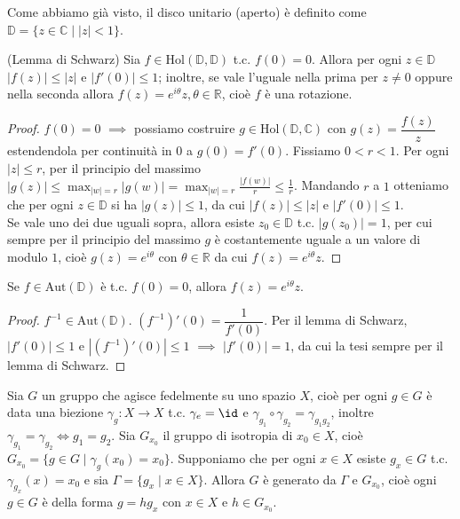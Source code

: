 Come abbiamo già visto, il disco unitario (aperto) è definito come $\mathbb{D}=\{z \in \mathbb{C} \mid |z|<1\}$.

\begin{lm}
  (Lemma di Schwarz) Sia $f \in \text{Hol}(\mathbb{D}, \mathbb{D})$ t.c. $f(0)=0$. Allora per ogni $z \in \mathbb{D}$ $|f(z)| \le |z|$ e $|f'(0)| \le 1$; inoltre, se vale l'uguale nella prima per $z \not=0$ oppure nella seconda allora $f(z)=e^{i\theta}z, \theta \in \mathbb{R}$, cioè $f$ è una rotazione.
\end{lm}

\begin{proof}
  $f(0)=0$ $\implies$ possiamo costruire $g \in \text{Hol}(\mathbb{D}, \mathbb{C})$ con $g(z)=\dfrac{f(z)}{z}$ estendendola per continuità in $0$ a $g(0)=f'(0)$. Fissiamo $0<r<1$.
  Per ogni $|z| \le r$, per il principio del massimo $\displaystyle |g(z)| \le \max_{|w|=r} |g(w)|=\max_{|w|=r} \frac{|f(w)|}{r} \le \frac{1}{r}$. Mandando $r$ a $1$ otteniamo che per ogni $z \in \mathbb{D}$ si ha $|g(z)| \le 1$, da cui $|f(z)|\le |z|$ e $|f'(0)| \le 1$. \\
  Se vale uno dei due uguali sopra, allora esiste $z_0 \in \mathbb{D}$ t.c. $|g(z_0)|=1$, per cui sempre per il principio del massimo $g$ è costantemente uguale a un valore di modulo $1$, cioè $g(z)=e^{i\theta}$ con $\theta \in \mathbb{R}$ da cui $f(z)=e^{i\theta}z$.
\end{proof}

\begin{cor}
  Se $f \in \text{Aut}(\mathbb{D})$ è t.c. $f(0)=0$, allora $f(z)=e^{i\theta}z$.
\end{cor}

\begin{proof}
  $f^{-1} \in \text{Aut}(\mathbb{D})$. $(f^{-1})'(0)=\dfrac{1}{f'(0)}$. Per il lemma di Schwarz, $|f'(0)| \le 1$ e $|(f^{-1})'(0)| \le 1$ $\implies$ $|f'(0)|=1$, da cui la tesi sempre per il lemma di Schwarz.
\end{proof}

\begin{lm} \label{az_gr}
  Sia $G$ un gruppo che agisce fedelmente su uno spazio $X$, cioè per ogni $g \in G$ è data una biezione $\gamma_g:X \longrightarrow X$ t.c. $\gamma_{e}=\id$ e $\gamma_{g_1} \circ \gamma_{g_2} =\gamma_{g_1g_2}$, inoltre $\gamma_{g_1}=\gamma_{g_2} \iff g_1=g_2$.
  Sia $G_{x_0}$ il gruppo di isotropia di $x_0 \in X$, cioè $G_{x_0}=\{g \in G \mid \gamma_g(x_0)=x_0\}$. Supponiamo che per ogni $x \in X$ esiste $g_x \in G$ t.c. $\gamma_{g_x}(x)=x_0$ e sia $\Gamma=\{g_x \mid x \in X\}$.
  Allora $G$ è generato da $\Gamma$ e $G_{x_0}$, cioè ogni $g \in G$ è della forma $g=hg_x$ con $x \in X$ e $h \in G_{x_0}$.
\end{lm}

